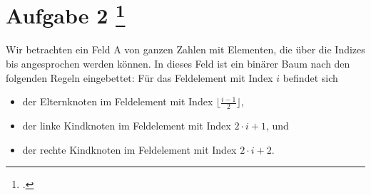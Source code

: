 \documentclass{lehramt-informatik-aufgabe}
\begin{document}

\section{Aufgabe 2
\footcite{66115:2020:09}}

Wir betrachten ein Feld A von ganzen Zahlen mit  Elementen, die über
die Indizes  bis  angesprochen werden können. In dieses Feld
ist ein binärer Baum nach den folgenden Regeln eingebettet: Für das
Feldelement mit Index $i$ befindet sich

\begin{itemize}
\item der Elternknoten im Feldelement mit Index $\lfloor\frac{i-1}{2}\rfloor$,

\item der linke Kindknoten im Feldelement mit Index $2 \cdot i + 1$, und

\item der rechte Kindknoten im Feldelement mit Index $2 \cdot i + 2$.
\end{itemize}
\end{document}
